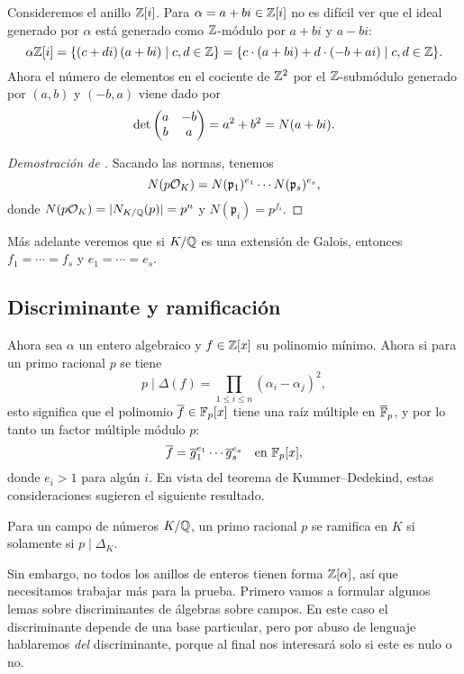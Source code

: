 \begin{ejemplo}
  Consideremos el anillo $\mathbb{Z} [i]$. Para $\alpha = a + bi \in \mathbb{Z}[i]$ no es
  difícil ver que el ideal generado por $\alpha$ está generado como $\mathbb{Z}$-módulo
  por $a + bi$ y $a - bi$:
  \[ \alpha\mathbb{Z}[i] = \{ (c+di)\,(a+bi) \mid c,d \in \mathbb{Z} \} =
                    \{ c\cdot(a+bi) + d\cdot(-b + ai) \mid c,d\in \mathbb{Z} \}. \]
  Ahora el número de elementos en el cociente de $\mathbb{Z}^2$ por el $\mathbb{Z}$-submódulo
  generado por $(a,b)$ y $(-b,a)$ viene dado por
  \[ \det \begin{pmatrix}
    a & -b \\
    b & a
  \end{pmatrix} = a^2 + b^2 = N (a + bi). \qedhere \]
\end{ejemplo}

\begin{proof}[Demostración de \label{ref:ei-fi}]
  Sacando las normas, tenemos
  $$N (p\mathcal{O}_K) = N (\mathfrak{p}_1)^{e_1} \cdots N (\mathfrak{p}_s)^{e_s},$$
  donde $N (p\mathcal{O}_K) = |N_{K/\mathbb{Q}} (p)| = p^n$ y $N (\mathfrak{p}_i) = p^{f_i}$.
\end{proof}

Más adelante veremos que si $K/\mathbb{Q}$ es una extensión de Galois, entonces
$f_1 = \cdots = f_s$ y $e_1 = \cdots = e_s$.

\subsection{Discriminante y ramificación}

Ahora sea $\alpha$ un entero algebraico y $f \in \mathbb{Z} [x]$ su polinomio mínimo.
Ahora si para un primo racional $p$ se tiene
$$p \mid \Delta (f) = \prod_{1 \le i \le n} (\alpha_i - \alpha_j)^2,$$
esto significa que el polinomio $\overline{f} \in \mathbb{F}_p [x]$ tiene una raíz
múltiple en $\overline{\mathbb{F}}_p$, y por lo tanto un factor múltiple módulo $p$:
\[ \overline{f} = \overline{g}_1^{e_1} \cdots \overline{g}_s^{e_s}
   \quad \text{en }\mathbb{F}_p[x], \]
donde $e_i > 1$ para algún $i$. En vista del teorema de Kummer--Dedekind,
estas consideraciones sugieren el siguiente resultado.

\begin{teorema}
  \label{thm:discriminante-y-ramificacion}
  Para un campo de números $K/\mathbb{Q}$, un primo racional $p$ se ramifica en $K$
  si solamente si $p \mid \Delta_K$.
\end{teorema}

Sin embargo, no todos los anillos de enteros tienen forma $\mathbb{Z} [\alpha]$, así
que necesitamos trabajar más para la prueba. Primero vamos a formular algunos
lemas sobre discriminantes de álgebras sobre campos. En este caso el
discriminante depende de una base particular, pero por abuso de lenguaje
hablaremos \emph{del} discriminante, porque al final nos interesará solo si este
es nulo o no.

